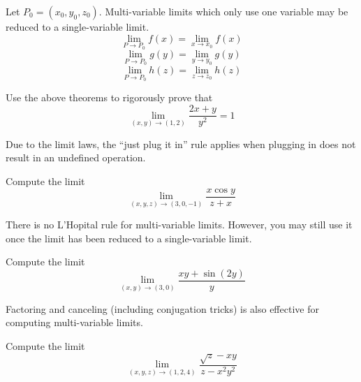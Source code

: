 \documentclass[letterpaper, twoside, 12pt]{book}
\begin{document}
\begin{theorem}
  Let $P_0=(x_0,y_0,z_0)$. Multi-variable limits which only use one
  variable may be reduced to a single-variable limit.
    \[
      \lim_{P\to P_0}f(x) = \lim_{x\to x_0}f(x)
    \]
    \[
      \lim_{P\to P_0}g(y) = \lim_{y\to y_0}g(y)
    \]
    \[
      \lim_{P\to P_0}h(z) = \lim_{z\to z_0}h(z)
    \]
\end{theorem}

          \begin{problem}
            Use the above theorems to rigorously prove that
              \[
                \lim_{(x,y)\to(1,2)}
                \frac{2x+y}{y^2}
                  =
                1
              \]
          \end{problem}

\begin{remark}
  Due to the limit laws, the ``just plug it in'' rule applies when
  plugging in does not result in an undefined operation.
\end{remark}

          \begin{problem}
            Compute the limit
              \[
                \lim_{(x,y,z)\to(3,0,-1)}
                \frac{x\cos y}{z+x}
              \]
          \end{problem}

\begin{remark}
  There is no L'Hopital rule for multi-variable limits.
  However, you may still use it once the limit has been reduced
  to a single-variable limit.
\end{remark}

          \begin{problem}
            Compute the limit
              \[
                \lim_{(x,y)\to(3,0)}
                \frac{xy+\sin(2y)}{y}
              \]
          \end{problem}

\begin{remark}
  Factoring and canceling (including conjugation tricks) is
  also effective for computing multi-variable limits.
\end{remark}

          \begin{problem}
            Compute the limit
              \[
                \lim_{(x,y,z)\to(1,2,4)}
                \frac{\sqrt{z}-xy}{z-x^2y^2}
              \]
          \end{problem}
\end{document}
